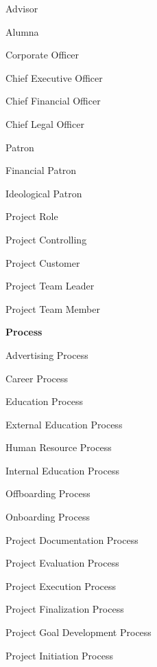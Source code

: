 \documentclass[a4paper, DIV=13, BCOR=0cm]{scrbook}
\begin{document}
\begin{multicols}{2}
\begin{compactitem}
\begin{compactitem}
			\begin{compactitem}
				\item Advisor
				\item Alumna
				\item Corporate Officer
				\begin{compactitem}
					\item Chief Executive Officer
					\item Chief Financial Officer
					\item Chief Legal Officer
				\end{compactitem}
				\item Patron
				\begin{compactitem}
					\item Financial Patron
					\item Ideological Patron
				\end{compactitem}
			\end{compactitem}
			\item Project Role
			\begin{compactitem}
				\item Project Controlling
				\item Project Customer
				\item Project Team Leader
				\item Project Team Member
			\end{compactitem}
		\end{compactitem}
		\columnbreak
		\item \textbf{Process}
		\begin{compactitem}
			\item Advertising Process
			\item Career Process
			\item Education Process
			\item External Education Process
			\item Human Resource Process
			\item Internal Education Process
			\item Offboarding Process
			\item Onboarding Process
			\item Project Documentation Process
			\item Project Evaluation Process
			\item Project Execution Process
			\item Project Finalization Process
			\item Project Goal Development Process
			\item Project Initiation Process

\end{compactitem}
\end{compactitem}
\end{multicols}
\end{document}
